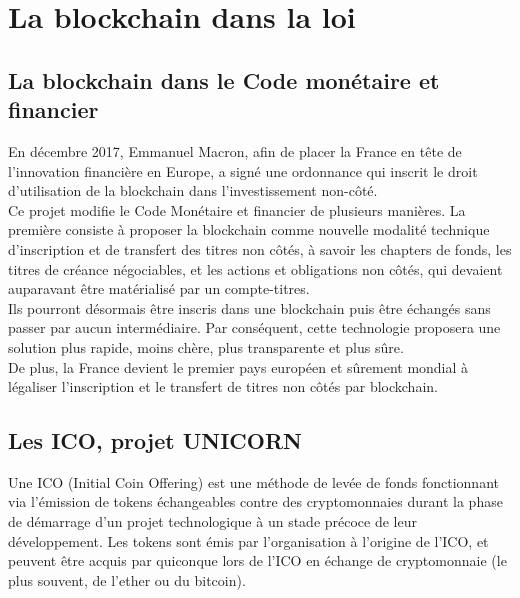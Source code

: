 \documentclass[12pt, a4paper, oneside]{book}
\begin{document}
    \section{La blockchain dans la loi}

    \subsection{La blockchain dans le Code monétaire et \\financier}

    En décembre 2017, Emmanuel Macron, afin de placer la France en tête de l'innovation financière en Europe, 
    a signé une ordonnance qui inscrit le droit d'utilisation de la blockchain dans l'investissement non-côté.
    \\
    \newline
    Ce projet modifie le Code Monétaire et financier de plusieurs manières. La première consiste à proposer la blockchain comme nouvelle 
    modalité technique d'inscription et de transfert des titres non côtés, à savoir les chapters de fonds, les titres de créance négociables,
    et les actions et obligations non côtés, qui devaient auparavant être matérialisé par un compte-titres.
    \\
    \newline
    Ils pourront désormais être inscris dans une blockchain puis être échangés sans passer par aucun intermédiaire.
    Par conséquent, cette technologie proposera une solution plus rapide, moins chère, plus transparente et plus sûre.
    \\
    \newline
    De plus, la France devient le premier pays européen et sûrement mondial à légaliser l'inscription et le transfert de titres non côtés par blockchain.
    \cite{CodeMonetaireFinancier}

    \subsection{Les ICO, projet UNICORN}

    Une ICO (Initial Coin Offering) est une méthode de levée de fonds fonctionnant via l’émission de tokens échangeables contre des cryptomonnaies 
    durant la phase de démarrage d’un projet technologique à un stade précoce de leur développement.
    Les tokens sont émis par l’organisation à l’origine de l’ICO, et peuvent être acquis par quiconque lors de l’ICO en échange de cryptomonnaie 
    (le plus souvent, de l’ether ou du bitcoin).
\end{document}
